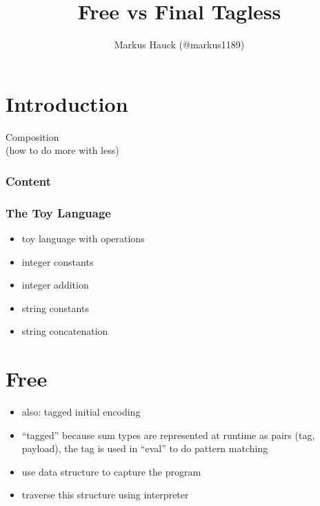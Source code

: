 \documentclass[aspectratio=169]{beamer}
\title{Free vs Final Tagless}
\author{Markus Hauck (@markus1189)}
\begin{document}
\begin{frame}
  \titlepage{}
\end{frame}

\section{Introduction}\label{sec:introduction}

\begin{frame}
  \begin{center}
    {\Huge Composition\\}
    (how to do more with less)
  \end{center}
\end{frame}

\begin{frame}[fragile]
  \frametitle{Content}
  \begin{center}
  \end{center}
\end{frame}

\begin{frame}
  \frametitle{The Toy Language}
  \begin{itemize}
  \item toy language with operations
  \item integer constants
  \item integer addition
  \item string constants
  \item string concatenation
  \end{itemize}
\end{frame}

\section{Free}\label{sec:free}

\begin{frame}
  \begin{itemize}
  \item also: tagged initial encoding
  \item ``tagged'' because sum types are represented at runtime as
    pairs (tag, payload), the tag is used in ``eval'' to do pattern
    matching
  \item use data structure to capture the program
  \item traverse this structure using interpreter
  \end{itemize}
\end{frame}
\end{document}
